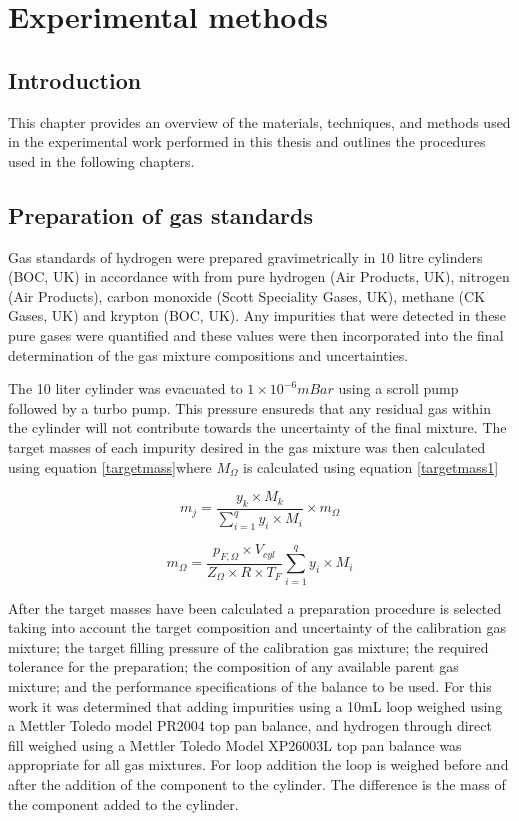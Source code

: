 \chapter{Experimental methods}
\section{Introduction}
This chapter provides an overview of the materials, techniques, and methods used in the experimental work performed in this thesis and outlines the procedures used in the following chapters. 
\section{Preparation of gas standards} \label{gasprep}
Gas standards of hydrogen were prepared gravimetrically in 10 litre cylinders (BOC, UK) in accordance with \cite{InternationalStandardISO6142-1:2015} from pure hydrogen (Air Products, UK), nitrogen (Air Products), carbon monoxide (Scott Speciality Gases, UK), methane (CK Gases, UK) and krypton (BOC, UK). Any impurities that were detected in these pure gases were quantified and these values were then incorporated into the final determination of the gas mixture compositions and uncertainties. 

The 10 liter cylinder was evacuated to $1 \times 10^{-6} mBar$ using a scroll pump followed by a turbo pump. This pressure ensureds that any residual gas within the cylinder will not contribute towards the uncertainty of the final mixture. \cite{InternationalStandardISO6142-1:2015} The target masses of each impurity desired in the gas mixture was then calculated using equation \ref{targetmass}where $M_\Omega$ is calculated using equation \ref{targetmass1}

\begin{equation}\label{targetmass} 
  m_j = \frac{y_k \times M_k}{\sum_{i=1}^{q}y_i \times M_i}\times m_\Omega
\end{equation}

\begin{equation}\label{targetmass1}
  m_\Omega = \frac{p_{F, \Omega} \times V_{cyl}}{Z_\Omega \times R \times T_F}\sum_{i=1}^{q}y_i \times M_i
\end{equation}

After the target masses have been calculated a preparation procedure is selected taking into account the target composition and uncertainty of the calibration gas mixture; the target filling pressure of the calibration gas mixture; the required tolerance for the preparation; the composition of any available parent gas mixture; and the performance specifications of the balance to be used.  For this work it was determined that adding impurities using a 10mL loop weighed using a Mettler Toledo model  PR2004 top pan balance, and hydrogen through direct fill weighed using a Mettler Toledo Model XP26003L top pan balance was appropriate for all gas mixtures. For loop addition the loop is weighed before and after the addition of the component to the cylinder. The difference is the mass of the component added to the cylinder. 

